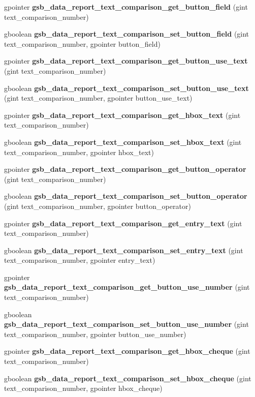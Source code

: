 \begin{DoxyCompactItemize}
\item 
gpointer {\bf gsb\_\-data\_\-report\_\-text\_\-comparison\_\-get\_\-button\_\-field} (gint text\_\-comparison\_\-number)
\item 
gboolean {\bf gsb\_\-data\_\-report\_\-text\_\-comparison\_\-set\_\-button\_\-field} (gint text\_\-comparison\_\-number, gpointer button\_\-field)
\item 
gpointer {\bf gsb\_\-data\_\-report\_\-text\_\-comparison\_\-get\_\-button\_\-use\_\-text} (gint text\_\-comparison\_\-number)
\item 
gboolean {\bf gsb\_\-data\_\-report\_\-text\_\-comparison\_\-set\_\-button\_\-use\_\-text} (gint text\_\-comparison\_\-number, gpointer button\_\-use\_\-text)
\item 
gpointer {\bf gsb\_\-data\_\-report\_\-text\_\-comparison\_\-get\_\-hbox\_\-text} (gint text\_\-comparison\_\-number)
\item 
gboolean {\bf gsb\_\-data\_\-report\_\-text\_\-comparison\_\-set\_\-hbox\_\-text} (gint text\_\-comparison\_\-number, gpointer hbox\_\-text)
\item 
gpointer {\bf gsb\_\-data\_\-report\_\-text\_\-comparison\_\-get\_\-button\_\-operator} (gint text\_\-comparison\_\-number)
\item 
gboolean {\bf gsb\_\-data\_\-report\_\-text\_\-comparison\_\-set\_\-button\_\-operator} (gint text\_\-comparison\_\-number, gpointer button\_\-operator)
\item 
gpointer {\bf gsb\_\-data\_\-report\_\-text\_\-comparison\_\-get\_\-entry\_\-text} (gint text\_\-comparison\_\-number)
\item 
gboolean {\bf gsb\_\-data\_\-report\_\-text\_\-comparison\_\-set\_\-entry\_\-text} (gint text\_\-comparison\_\-number, gpointer entry\_\-text)
\item 
gpointer {\bf gsb\_\-data\_\-report\_\-text\_\-comparison\_\-get\_\-button\_\-use\_\-number} (gint text\_\-comparison\_\-number)
\item 
gboolean {\bf gsb\_\-data\_\-report\_\-text\_\-comparison\_\-set\_\-button\_\-use\_\-number} (gint text\_\-comparison\_\-number, gpointer button\_\-use\_\-number)
\item 
gpointer {\bf gsb\_\-data\_\-report\_\-text\_\-comparison\_\-get\_\-hbox\_\-cheque} (gint text\_\-comparison\_\-number)
\item 
gboolean {\bf gsb\_\-data\_\-report\_\-text\_\-comparison\_\-set\_\-hbox\_\-cheque} (gint text\_\-comparison\_\-number, gpointer hbox\_\-cheque)
\item 

\end{DoxyCompactItemize}

